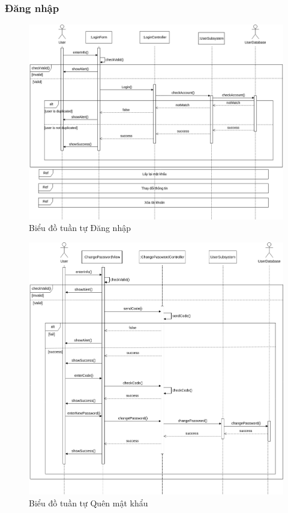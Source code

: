 \subsubsection{Đăng nhập}
\begin{figure}[H]
    \centering
    \includegraphics[width=\textwidth]{img3.4/Design_diagram-Đăng nhập.drawio.png} 
    \caption{Biểu đồ tuần tự Đăng nhập}
\end{figure}

\begin{figure}[H]
    \centering
    \includegraphics[width=\textwidth]{img3.4/Design_diagram-Quên mật khẩu.drawio.png} 
    \caption{Biểu đồ tuần tự Quên mật khẩu}
\end{figure}

